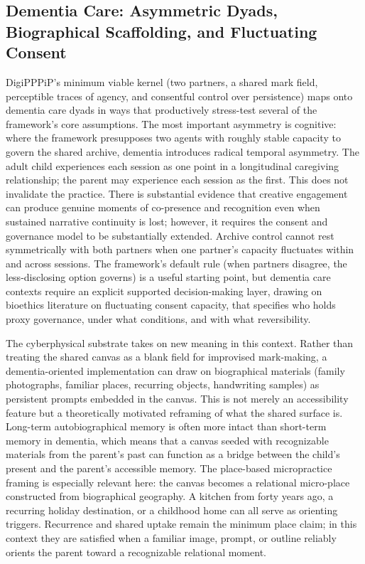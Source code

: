 \documentclass[
  english,
]{article}
\begin{document}
\subsection{Dementia Care: Asymmetric Dyads, Biographical Scaffolding,
and Fluctuating
Consent}\label{dementia-care-asymmetric-dyads-biographical-scaffolding-and-fluctuating-consent}

DigiPPPiP's minimum viable kernel (two partners, a shared mark field,
perceptible traces of agency, and consentful control over persistence)
maps onto dementia care dyads in ways that productively stress-test
several of the framework's core assumptions. The most important
asymmetry is cognitive: where the framework presupposes two agents with
roughly stable capacity to govern the shared archive, dementia
introduces radical temporal asymmetry. The adult child experiences each
session as one point in a longitudinal caregiving relationship; the
parent may experience each session as the first. This does not
invalidate the practice. There is substantial evidence that creative
engagement can produce genuine moments of co-presence and recognition
even when sustained narrative continuity is lost; however, it requires
the consent and governance model to be substantially extended. Archive
control cannot rest symmetrically with both partners when one partner's
capacity fluctuates within and across sessions. The framework's default
rule (when partners disagree, the less-disclosing option governs) is a
useful starting point, but dementia care contexts require an explicit
supported decision-making layer, drawing on bioethics literature on
fluctuating consent capacity, that specifies who holds proxy governance,
under what conditions, and with what reversibility.

The cyberphysical substrate takes on new meaning in this context. Rather
than treating the shared canvas as a blank field for improvised
mark-making, a dementia-oriented implementation can draw on biographical
materials (family photographs, familiar places, recurring objects,
handwriting samples) as persistent prompts embedded in the canvas. This
is not merely an accessibility feature but a theoretically motivated
reframing of what the shared surface is. Long-term autobiographical
memory is often more intact than short-term memory in dementia, which
means that a canvas seeded with recognizable materials from the parent's
past can function as a bridge between the child's present and the
parent's accessible memory. The place-based micropractice framing is
especially relevant here: the canvas becomes a relational micro-place
constructed from biographical geography. A kitchen from forty years ago,
a recurring holiday destination, or a childhood home can all serve as
orienting triggers. Recurrence and shared uptake remain the minimum
place claim; in this context they are satisfied when a familiar image,
prompt, or outline reliably orients the parent toward a recognizable
relational moment.
\end{document}
